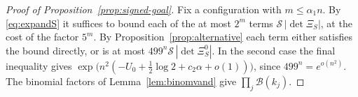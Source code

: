\begin{proof}[Proof of Proposition~\ref{prop:signed-goal}]
Fix a configuration with $m\le\alpha_1n$. By \eqref{eq:expandS} it suffices to bound each of the at most $2^m$ terms
$\mathcal S\,|\det\Xi_S|$, at the cost of the factor $5^m$. By Proposition~\ref{prop:alternative} each term either satisfies the
bound directly, or is at most $499^n\mathcal S\,|\det\Xi^0_S|$. In the second case the final inequality gives
$\exp\bigl(n^2(-U_0+\frac12\log2+c_2\alpha+o(1))\bigr)$, since $499^n=e^{o(n^2)}$. The binomial factors of
Lemma~\ref{lem:binomvand} give $\prod_j\mathcal B(k_j)$.
\end{proof}
